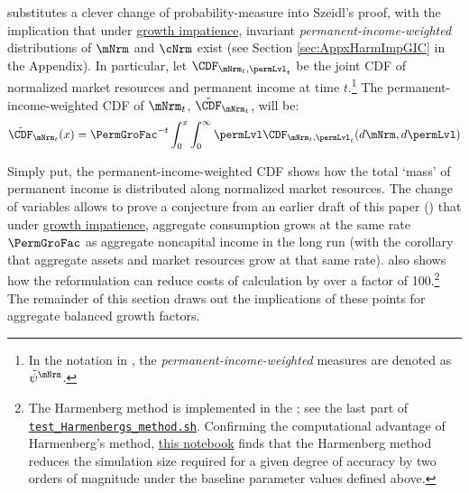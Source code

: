 \documentclass[\econtexRoot/BufferStockTheory]{subfiles}
\begin{document}
\cite{harmenbergInvariant} substitutes a clever change of probability-measure into Szeidl's proof, with the implication that under \hyperlink{GICRaw}{growth impatience}, invariant \emph{permanent-income-weighted} distributions of $\mNrm$ and $\cNrm$ exist (see Section \ref{sec:AppxHarmImpGIC} in the Appendix).
In particular, let $\CDF_{\mNrm_{t},\permLvl_{t}}$ be the joint CDF of normalized market resources and permanent income at time $t$.\footnote{In the notation in \cite{harmenbergInvariant}, the \emph{permanent-income-weighted} measures are denoted as $\tilde{\psi}^{\mNrm}$.} The permanent-income-weighted CDF of $\mNrm_{t}$, $\Harm{\CDF}_{\mNrm_{t}}$, will be:
%
\begin{equation}\label{eq:HarmCDF}
\Harm{\CDF}_{\mNrm_{t}}(x) = \PermGroFac^{-t}\int_{0}^{x}\int_{0}^{\infty} \permLvl\CDF_{\mNrm_{t},\permLvl_{t}}(d\mNrm,d\permLvl)
\end{equation}

Simply put, the permanent-income-weighted CDF shows how the total `mass' of permanent income is distributed along normalized market resources. The change of variables allows \cite{harmenbergInvariant} to prove a conjecture from an earlier draft of this paper (\cite{BufferStockTheoryQESubmit}) that under \hyperlink{GICRaw}{growth impatience}, aggregate consumption grows at the same rate $\PermGroFac$ as aggregate noncapital income in the long run (with the corollary that aggregate assets and market resources grow at that same rate).\hypertarget{test-Harmenbergs-method}{} \cite{harmenbergInvariant} also shows how the reformulation can reduce costs of calculation by over a factor of 100.\footnote{The Harmenberg method is implemented in the {\ARKurl}; see the last part of \href{https://github.com/econ-ark/BufferStockTheory/blob/master/Code/Python/test_Harmenbergs_method.sh}{\texttt{test\_Harmenbergs\_method.sh}}.
Confirming the computational advantage of Harmenberg's method, \href{https://econ-ark.org/materials/harmenberg-aggregation}{this notebook} finds that the Harmenberg method reduces the simulation size required for a given degree of accuracy by two orders of magnitude under the baseline parameter values defined above.} The remainder of this section draws out the implications of these points for aggregate balanced growth factors.
\end{document}
